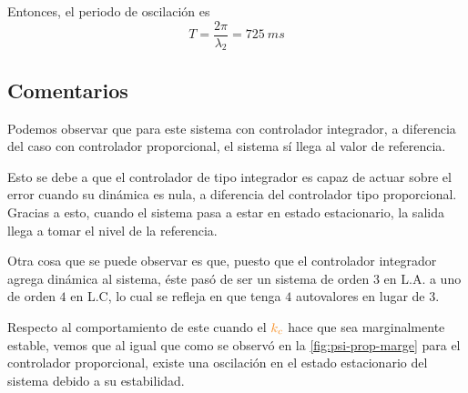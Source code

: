 Entonces, el periodo de oscilación es
\begin{equation}
  T = \frac{2\pi}{\mathfrak{\lambda_{2}}} = 725\ \unit{ms}
\end{equation}

\subsection{Comentarios}

Podemos observar que para este sistema con controlador integrador, a diferencia
del caso con controlador proporcional, el sistema sí llega al valor de referencia.

Esto se debe a que el controlador de tipo integrador es capaz de actuar sobre el
error cuando su dinámica es nula, a diferencia del controlador tipo proporcional.
Gracias a esto, cuando el sistema pasa a estar en estado estacionario, la salida
llega a tomar el nivel de la referencia.

Otra cosa que se puede observar es que, puesto que el controlador integrador
agrega dinámica al sistema, éste pasó de ser un sistema de orden $3$ en L.A. a
uno de orden $4$ en L.C, lo cual se refleja en que tenga $4$ autovalores en lugar
de $3$.

Respecto al comportamiento de este cuando el $\nara{k_{c}}$ hace que sea
marginalmente estable, vemos que al igual que como se observó en la \autoref{fig:psi-prop-marge}
para el controlador proporcional, existe una oscilación en el estado estacionario
del sistema debido a su estabilidad.
